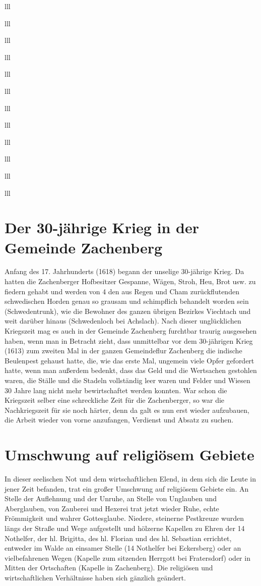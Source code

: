\documentclass[12pt,a4pager]{book}
\begin{document}
\begin{tabuluar}{lll}
\begin{tabuluar}{lll}
\begin{tabuluar}{lll}
\begin{tabuluar}{lll}
\begin{tabuluar}{lll}
\begin{tabuluar}{lll}
\begin{tabuluar}{lll}
\begin{tabuluar}{lll}
\begin{tabuluar}{lll}
\begin{tabuluar}{lll}
\begin{tabuluar}{lll}
\begin{tabuluar}{lll}
\section{Der 30-jährige Krieg in der Gemeinde Zachenberg}

Anfang des 17. Jahrhunderts (1618) begann der unselige 30-jährige Krieg. Da
hatten die Zachenberger Hofbesitzer Gespanne, Wägen, Stroh, Heu, Brot usw. zu
fiedern gehabt und werden von 4 den aus Regen und Cham zurückflutenden
schwedischen Horden genau so grausam und schimpflich behandelt worden sein
(Schwedentrunk), wie die Bewohner des ganzen übrigen Bezirkes Viechtach und weit
darüber hinaus (Schwedenloch bei Achslach). Nach dieser unglücklichen Kriegszeit
mag es auch in der Gemeinde Zachenberg furchtbar traurig ausgesehen haben, wenn
man in Betracht zieht, dass unmittelbar vor dem 30-jährigen Krieg (1613) zum
zweiten Mal in der ganzen Gemeindeflur Zachenberg die indische Beulenpest
gehaust hatte, die, wie das erste Mal, ungemein viele Opfer gefordert hatte,
wenn man außerdem bedenkt, dass das Geld und die Wertsachen gestohlen waren, die
Ställe und die Stadeln vollständig leer waren und Felder und Wiesen 30 Jahre
lang nicht mehr bewirtschaftet werden konnten. War schon die Kriegszeit selber
eine schreckliche Zeit für die Zachenberger, so war die Nachkriegszeit für sie
noch härter, denn da galt es nun erst wieder aufzubauen, die Arbeit wieder von
vorne anzufangen, Verdienst und Absatz zu suchen.

\section{Umschwung auf religiösem Gebiete}

In dieser seelischen Not und dem wirtschaftlichen Elend, in dem sich die Leute
in jener Zeit befanden, trat ein großer Umschwung auf religiösem Gebiete ein. An
Stelle der Auflehnung und der Unruhe, an Stelle von Unglauben und Aberglauben,
von Zauberei und Hexerei trat jetzt wieder Ruhe, echte Frömmigkeit und wahrer
Gottesglaube. Niedere, steinerne Pestkreuze wurden längs der Straße und Wege
aufgestellt und hölzerne Kapellen zu Ehren der 14 Nothelfer, der hl. Brigitta,
des hl. Florian und des hl. Sebastian errichtet, entweder im Walde an einsamer
Stelle (14 Nothelfer bei Eckersberg) oder an vielbefahrenen Wegen (Kapelle zum
sitzenden Herrgott bei Fratersdorf) oder in Mitten der Ortschaften (Kapelle in
Zachenberg). Die religiösen und wirtschaftlichen Verhältnisse haben sich
gänzlich geändert.


\end{tabuluar}
\end{tabuluar}
\end{tabuluar}
\end{tabuluar}
\end{tabuluar}
\end{tabuluar}
\end{tabuluar}
\end{tabuluar}
\end{tabuluar}
\end{tabuluar}
\end{tabuluar}
\end{tabuluar}
\end{document}
